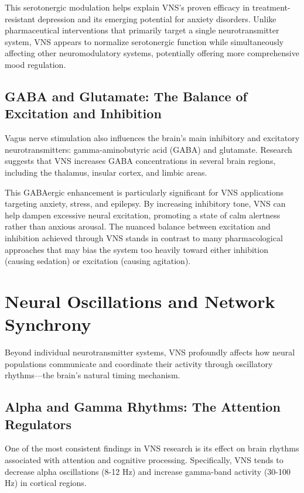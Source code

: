 \documentclass[
  Letterpaper,
]{scrbook}
\begin{document}
This serotonergic modulation helps explain VNS's proven efficacy in
treatment-resistant depression and its emerging potential for anxiety
disorders. Unlike pharmaceutical interventions that primarily target a
single neurotransmitter system, VNS appears to normalize serotonergic
function while simultaneously affecting other neuromodulatory systems,
potentially offering more comprehensive mood regulation.

\subsection{GABA and Glutamate: The Balance of Excitation and
Inhibition}\label{gaba-and-glutamate-the-balance-of-excitation-and-inhibition}

Vagus nerve stimulation also influences the brain's main inhibitory and
excitatory neurotransmitters: gamma-aminobutyric acid (GABA) and
glutamate. Research suggests that VNS increases GABA concentrations in
several brain regions, including the thalamus, insular cortex, and
limbic areas.

This GABAergic enhancement is particularly significant for VNS
applications targeting anxiety, stress, and epilepsy. By increasing
inhibitory tone, VNS can help dampen excessive neural excitation,
promoting a state of calm alertness rather than anxious arousal. The
nuanced balance between excitation and inhibition achieved through VNS
stands in contrast to many pharmacological approaches that may bias the
system too heavily toward either inhibition (causing sedation) or
excitation (causing agitation).

\section{Neural Oscillations and Network
Synchrony}\label{neural-oscillations-and-network-synchrony}

Beyond individual neurotransmitter systems, VNS profoundly affects how
neural populations communicate and coordinate their activity through
oscillatory rhythms---the brain's natural timing mechanism.

\subsection{Alpha and Gamma Rhythms: The Attention
Regulators}\label{alpha-and-gamma-rhythms-the-attention-regulators}

One of the most consistent findings in VNS research is its effect on
brain rhythms associated with attention and cognitive processing.
Specifically, VNS tends to decrease alpha oscillations (8-12 Hz) and
increase gamma-band activity (30-100 Hz) in cortical regions.
\end{document}
